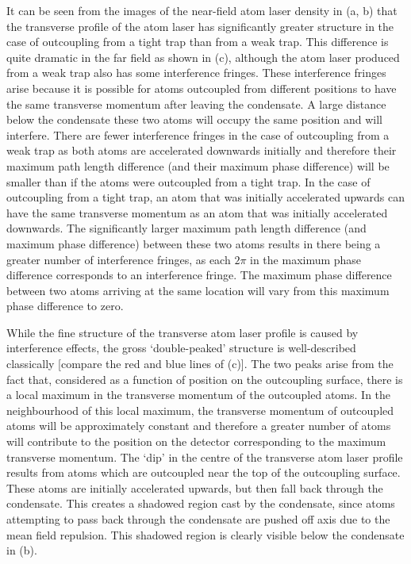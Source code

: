 It can be seen from the images of the near-field atom laser density in (a, b) that the transverse profile of the atom laser has significantly greater structure in the case of outcoupling from a tight trap than from a weak trap. This difference is quite dramatic in the far field as shown in (c), although the atom laser produced from a weak trap also has some interference fringes.  These interference fringes arise because it is possible for atoms outcoupled from different positions to have the same transverse momentum after leaving the condensate.  A large distance below the condensate these two atoms will occupy the same position and will interfere.  There are fewer interference fringes in the case of outcoupling from a weak trap as both atoms are accelerated downwards initially and therefore their maximum path length difference (and their maximum phase difference) will be smaller than if the atoms were outcoupled from a tight trap.  In the case of outcoupling from a tight trap, an atom that was initially accelerated upwards can have the same transverse momentum as an atom that was initially accelerated downwards.  The significantly larger maximum path length difference (and maximum phase difference) between these two atoms results in there being a greater number of interference fringes, as each $2\pi$ in the maximum phase difference corresponds to an interference fringe.  The maximum phase difference between two atoms arriving at the same location will vary from this maximum phase difference to zero.

While the fine structure of the transverse atom laser profile is caused by interference effects, the gross `double-peaked' structure is well-described classically [compare the red and blue lines of (c)].  The two peaks arise from the fact that, considered as a function of position on the outcoupling surface, there is a local maximum in the transverse momentum of the outcoupled atoms.  In the neighbourhood of this local maximum, the transverse momentum of outcoupled atoms will be approximately constant and therefore a greater number of atoms will contribute to the position on the detector corresponding to the maximum transverse momentum.  The `dip' in the centre of the transverse atom laser profile results from atoms which are outcoupled near the top of the outcoupling surface.  These atoms are initially accelerated upwards, but then fall back through the condensate.  This creates a shadowed region cast by the condensate, since atoms attempting to pass back through the condensate are pushed off axis due to the mean field repulsion.  This shadowed region is clearly visible below the condensate in (b).

